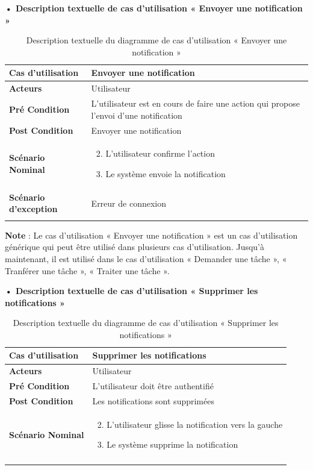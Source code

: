 \textbf{•	Description textuelle de cas d'utilisation « Envoyer une notification »}

\begin{longtable}{|p{5cm}|p{10cm}|}
\hline
\textbf{Cas d'utilisation}&Envoyer une notification\\
\hline
\textbf{Acteurs}&Utilisateur \\
\hline
\textbf{Pré Condition}&L'utilisateur est en cours de faire une action qui propose l'envoi d'une notification\\
\hline
\textbf{Post Condition}&Envoyer une notification\\
\hline
\textbf{Scénario Nominal}&
\vspace{-\baselineskip}
\begin{enumerate}
    \setcounter{enumi}{1}
        \item L'utilisateur confirme l'action
        \item Le système envoie la notification
\end{enumerate}\\
\hline
\textbf{Scénario d'exception}&Erreur de connexion\\
\hline
\caption{Description textuelle du diagramme de cas d'utilisation « Envoyer une notification »}
\label{tab:use_case_envoyer_notifications}
\end{longtable}

\textbf{Note} : Le cas d'utilisation « Envoyer une notification » est un cas d'utilisation générique qui peut être utilisé dans plusieurs cas d'utilisation. Jusqu'à maintenant, il est utilisé dans le cas d'utilisation « Demander une tâche », « Tranférer une tâche », « Traiter une tâche ».

\textbf{•	Description textuelle de cas d'utilisation « Supprimer les notifications »}



\begin{longtable}{|p{5cm}|p{10cm}|}
\hline
\textbf{Cas d'utilisation}&Supprimer les notifications\\
\hline
\textbf{Acteurs}&Utilisateur \\
\hline
\textbf{Pré Condition}&L'utilisateur doit être authentifié\\
\hline
\textbf{Post Condition}&Les notifications sont supprimées\\
\hline
\textbf{Scénario Nominal}&
\vspace{-\baselineskip}
\begin{enumerate}
    \setcounter{enumi}{1}
      \item L'utilisateur glisse la notification vers la gauche
      \item Le système supprime la notification
\end{enumerate}\\
\hline
\caption{Description textuelle du diagramme de cas d'utilisation « Supprimer les notifications »}
\label{tab:use_case_supprimer_notifications}
\end{longtable}



